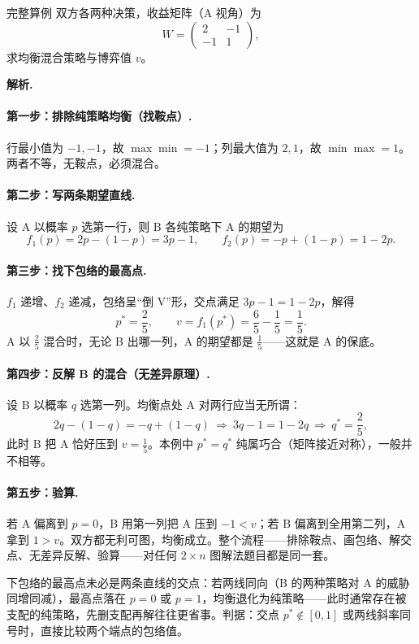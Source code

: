 \documentclass[UTF8,a4paper,11pt,oneside,openany,fontset=fandol]{ctexbook}
\theoremstyle{definition}
\newcommand{\sol}{\par\noindent\textbf{解析.}\ }
\begin{document}
\begin{problem}{完整算例}
双方各两种决策，收益矩阵（A 视角）为
\[
 W=\begin{pmatrix}2&-1\\-1&1\end{pmatrix},
\]
求均衡混合策略与博弈值 $v$。
\end{problem}

\sol \paragraph{第一步：排除纯策略均衡（找鞍点）.} 行最小值为 $-1,-1$，故 $\max\min=-1$；列最大值为 $2,1$，故 $\min\max=1$。两者不等，无鞍点，必须混合。

\paragraph{第二步：写两条期望直线.} 设 A 以概率 $p$ 选第一行，则 B 各纯策略下 A 的期望为
\[
 f_1(p)=2p-(1-p)=3p-1,\qquad f_2(p)=-p+(1-p)=1-2p .
\]
\paragraph{第三步：找下包络的最高点.} $f_1$ 递增、$f_2$ 递减，包络呈“倒 V”形，交点满足 $3p-1=1-2p$，解得
\[
 p^{*}=\frac25,\qquad v=f_1(p^{*})=\frac65-\frac15=\frac15 .
\]
A 以 $\tfrac25$ 混合时，无论 B 出哪一列，A 的期望都是 $\tfrac15$——这就是 A 的保底。

\paragraph{第四步：反解 B 的混合（无差异原理）.} 设 B 以概率 $q$ 选第一列。均衡点处 A 对两行应当无所谓：
\[
 2q-(1-q)=-q+(1-q)\ \Longrightarrow\ 3q-1=1-2q\ \Longrightarrow\ q^{*}=\frac25,
\]
此时 B 把 A 恰好压到 $v=\tfrac15$。本例中 $p^{*}=q^{*}$ 纯属巧合（矩阵接近对称），一般并不相等。

\paragraph{第五步：验算.} 若 A 偏离到 $p=0$，B 用第一列把 A 压到 $-1<v$；若 B 偏离到全用第二列，A 拿到 $1>v$。双方都无利可图，均衡成立。整个流程——排除鞍点、画包络、解交点、无差异反解、验算——对任何 $2\times n$ 图解法题目都是同一套。

\begin{pitfall}
下包络的最高点未必是两条直线的交点：若两线同向（B 的两种策略对 A 的威胁同增同减），最高点落在 $p=0$ 或 $p=1$，均衡退化为纯策略——此时通常存在被支配的纯策略，先删支配再解往往更省事。判据：交点 $p^{*}\notin[0,1]$ 或两线斜率同号时，直接比较两个端点的包络值。
\end{pitfall}
\end{document}
